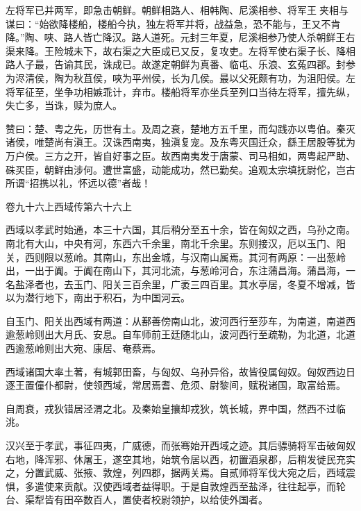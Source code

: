 \documentclass[12pt,UTF8]{ctexbook}
\begin{document}
左将军已并两军，即急击朝鲜。朝鲜相路人、相韩陶、尼溪相参、将军王夹相与谋曰：“始欲降楼船，楼船今执，独左将军并将，战益急，恐不能与，王又不肯降。”陶、唊、路人皆亡降汉。路人道死。元封三年夏，尼溪相参乃使人杀朝鲜王右渠来降。王险城未下，故右渠之大臣成已又反，复攻吏。左将军使右渠子长、降相路人子最，告谕其民，诛成已。故遂定朝鲜为真番、临屯、乐浪、玄菟四郡。封参为浕清侯，陶为秋苴侯，唊为平州侯，长为几侯。最以父死颇有功，为沮阳侯。左将军征至，坐争功相嫉乖计，弃市。楼船将军亦坐兵至列口当待左将军，擅先纵，失亡多，当诛，赎为庶人。



赞曰：楚、粤之先，历世有土。及周之衰，楚地方五千里，而勾践亦以粤伯。秦灭诸侯，唯楚尚有滇王。汉诛西南夷，独滇复宠。及东粤灭国迁众，繇王居股等犹为万户侯。三方之开，皆自好事之臣。故西南夷发于唐蒙、司马相如，两粤起严助、硃买臣，朝鲜由涉何。遭世富盛，动能成功，然已勤矣。追观太宗填抚尉佗，岂古所谓“招携以礼，怀远以德”者哉！





卷九十六上西域传第六十六上



西域以孝武时始通，本三十六国，其后稍分至五十余，皆在匈奴之西，乌孙之南。南北有大山，中央有河，东西六千余里，南北千余里。东则接汉，厄以玉门、阳关，西则限以葱岭。其南山，东出金城，与汉南山属焉。其河有两原：一出葱岭出，一出于阗。于阗在南山下，其河北流，与葱岭河合，东注蒲昌海。蒲昌海，一名盐泽者也，去玉门、阳关三百余里，广袤三四百里。其水亭居，冬夏不增减，皆以为潜行地下，南出于积石，为中国河云。



自玉门、阳关出西域有两道：从鄯善傍南山北，波河西行至莎车，为南道，南道西逾葱岭则出大月氏、安息。自车师前王廷随北山，波河西行至疏勒，为北道，北道西逾葱岭则出大宛、康居、奄蔡焉。



西域诸国大率土著，有城郭田畜，与匈奴、乌孙异俗，故皆役属匈奴。匈奴西边日逐王置僮仆都尉，使领西域，常居焉耆、危须、尉黎间，赋税诸国，取富给焉。



自周衰，戎狄错居泾渭之北。及秦始皇攘却戎狄，筑长城，界中国，然西不过临洮。



汉兴至于孝武，事征四夷，广威德，而张骞始开西域之迹。其后骠骑将军击破匈奴右地，降浑邪、休屠王，遂空其地，始筑令居以西，初置酒泉郡，后稍发徙民充实之，分置武威、张掖、敦煌，列四郡，据两关焉。自贰师将军伐大宛之后，西域震惧，多遣使来贡献。汉使西域者益得职。于是自敦煌西至盐泽，往往起亭，而轮台、渠犁皆有田卒数百人，置使者校尉领护，以给使外国者。
\end{document}
